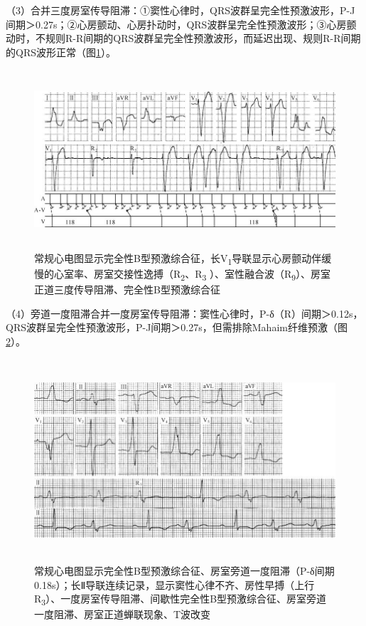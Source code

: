 （3）合并三度房室传导阻滞：①窦性心律时，QRS波群呈完全性预激波形，P-J间期＞0.27s；②心房颤动、心房扑动时，QRS波群呈完全性预激波形；③心房颤动时，不规则R-R间期的QRS波群呈完全性预激波形，而延迟出现、规则R-R间期的QRS波形正常（图\ref{fig36-19}）。

\begin{figure}[!htbp]
 \centering
 \includegraphics[width=5.78125in,height=2.61458in]{./images/Image00591.jpg}
 \captionsetup{justification=centering}
 \caption{常规心电图显示完全性B型预激综合征，长V\textsubscript{1}导联显示心房颤动伴缓慢的心室率、房室交接性逸搏（R\textsubscript{2}、R\textsubscript{3} ）、室性融合波（R\textsubscript{9}）、房室正道三度传导阻滞、完全性B型预激综合征}
 \label{fig36-19}
  \end{figure} 


（4）旁道一度阻滞合并一度房室传导阻滞：窦性心律时，P-δ（R）间期＞0.12s，QRS波群呈完全性预激波形，P-J间期＞0.27s，但需排除Mahaim纤维预激（图\ref{fig36-20}）。

\begin{figure}[!htbp]
 \centering
 \includegraphics[width=5.76042in,height=2.95833in]{./images/Image00592.jpg}
 \captionsetup{justification=centering}
 \caption{常规心电图显示完全性B型预激综合征、房室旁道一度阻滞（P-δ间期0.18s）；长Ⅱ导联连续记录，显示窦性心律不齐、房性早搏（上行R\textsubscript{3}）、一度房室传导阻滞、间歇性完全性B型预激综合征、房室旁道一度阻滞、房室正道蝉联现象、T波改变}
 \label{fig36-20}
  \end{figure} 


